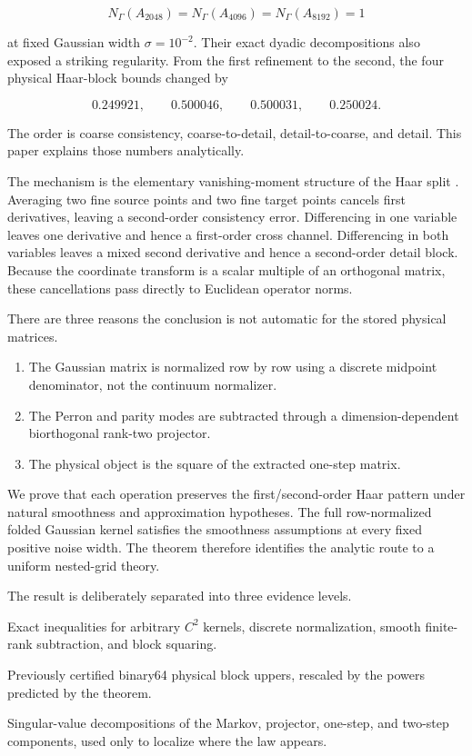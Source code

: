 \documentclass[11pt]{article}
\theoremstyle{definition}
\theoremstyle{remark}
\begin{document}
\[
N_\Gamma(A_{2048})=N_\Gamma(A_{4096})=N_\Gamma(A_{8192})=1
\]

at fixed Gaussian width $\sigma=10^{-2}$.  Their exact dyadic decompositions
also exposed a striking regularity.  From the first refinement to the second,
the four physical Haar-block bounds changed by

\[
0.249921,\qquad0.500046,\qquad0.500031,\qquad0.250024.
\]

The order is coarse consistency, coarse-to-detail, detail-to-coarse, and
detail.  This paper explains those numbers analytically.

The mechanism is the elementary vanishing-moment structure of the Haar split
\citep{Daubechies1992}.  Averaging two fine source points and two fine target
points cancels first derivatives, leaving a second-order consistency error.
Differencing in one variable leaves one derivative and hence a first-order
cross channel.  Differencing in both variables leaves a mixed second
derivative and hence a second-order detail block.  Because the coordinate
transform is a scalar multiple of an orthogonal matrix, these cancellations
pass directly to Euclidean operator norms.

There are three reasons the conclusion is not automatic for the stored
physical matrices.

\begin{enumerate}[leftmargin=2em]
 \item The Gaussian matrix is normalized row by row using a discrete midpoint
       denominator, not the continuum normalizer.
 \item The Perron and parity modes are subtracted through a dimension-dependent
       biorthogonal rank-two projector.
 \item The physical object is the square of the extracted one-step matrix.
\end{enumerate}

We prove that each operation preserves the first/second-order Haar pattern
under natural smoothness and approximation hypotheses.  The full
row-normalized folded Gaussian kernel satisfies the smoothness assumptions at
every fixed positive noise width.  The theorem therefore identifies the
analytic route to a uniform nested-grid theory.

The result is deliberately separated into three evidence levels.

\begin{description}[leftmargin=2.7cm,style=nextline]
 \item[Analytic theorem]
 Exact inequalities for arbitrary $C^2$ kernels, discrete normalization,
 smooth finite-rank subtraction, and block squaring.
 \item[Rigorous stored ledger]
 Previously certified binary64 physical block uppers, rescaled by the powers
 predicted by the theorem.
 \item[Floating mechanism audit]
 Singular-value decompositions of the Markov, projector, one-step, and
 two-step components, used only to localize where the law appears.
\end{description}
\end{document}
